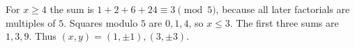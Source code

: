 For $x\ge4$ the sum is $1+2+6+24\equiv3\pmod5$, because all later factorials are multiples of $5$. Squares modulo $5$ are $0,1,4$, so $x\le3$. The first three sums are $1,3,9$. Thus $\boxed{(x,y)=(1,\pm1),(3,\pm3)}$.
